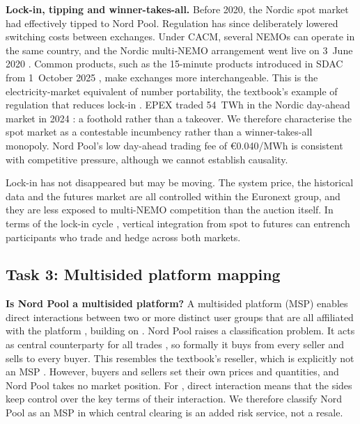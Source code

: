 \textbf{Lock-in, tipping and winner-takes-all.} Before 2020, the Nordic spot market had effectively tipped to Nord Pool. Regulation has since deliberately lowered switching costs between exchanges. Under CACM, several NEMOs can operate in the same country, and the Nordic multi-NEMO arrangement went live on 3~June 2020 \citep{EPEX2020,CACM2015}. Common products, such as the 15-minute products introduced in SDAC from 1~October 2025 \citep{OTE2025}, make exchanges more interchangeable. This is the electricity-market equivalent of number portability, the textbook's example of regulation that reduces lock-in \citep[Sect.~12.6]{OverbyAudestad2021}. EPEX traded 54~TWh in the Nordic day-ahead market in 2024 \citep{EPEX2025}: a foothold rather than a takeover. We therefore characterise the spot market as a contestable incumbency rather than a winner-takes-all monopoly. Nord Pool's low day-ahead trading fee of €0.040/MWh \citep{NPFees2026} is consistent with competitive pressure, although we cannot establish causality.

Lock-in has not disappeared but may be moving. The system price, the historical data and the futures market are all controlled within the Euronext group, and they are less exposed to multi-NEMO competition than the auction itself. In terms of the lock-in cycle \citep[Sect.~12.4]{OverbyAudestad2021}, vertical integration from spot to futures can entrench participants who trade and hedge across both markets.

\subsection{Task 3: Multisided platform mapping}
\label{sec:t3}

\textbf{Is Nord Pool a multisided platform?} A multisided platform (MSP) enables direct interactions between two or more distinct user groups that are all affiliated with the platform \citep[Def.~10.1]{OverbyAudestad2021}, building on \citet{HagiuWright2015}. Nord Pool raises a classification problem. It acts as central counterparty for all trades \citep{NPClearing}, so formally it buys from every seller and sells to every buyer. This resembles the textbook's reseller, which is explicitly not an MSP \citep[Sect.~10.5]{OverbyAudestad2021}. However, buyers and sellers set their own prices and quantities, and Nord Pool takes no market position. For \citet{HagiuWright2015}, direct interaction means that the sides keep control over the key terms of their interaction. We therefore classify Nord Pool as an MSP in which central clearing is an added risk service, not a resale.

